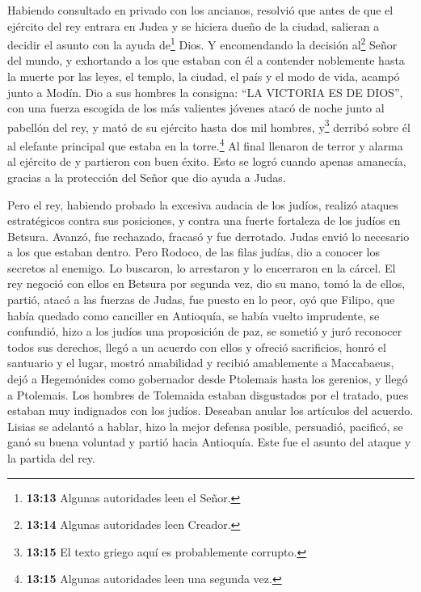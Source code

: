  Habiendo consultado en privado con los ancianos,
resolvió que antes de que el ejército del rey entrara en Judea y se
hiciera dueño de la ciudad, salieran a decidir el asunto con la ayuda
de\footnote{\textbf{13:13} Algunas autoridades leen el Señor.} Dios.
 Y encomendando la decisión al\footnote{\textbf{13:14}
  Algunas autoridades leen Creador.} Señor del mundo, y exhortando a los
que estaban con él a contender noblemente hasta la muerte por las leyes,
el templo, la ciudad, el país y el modo de vida, acampó junto a Modín.
 Dio a sus hombres la consigna: ``LA VICTORIA ES DE
DIOS'', con una fuerza escogida de los más valientes jóvenes atacó de
noche junto al pabellón del rey, y mató de su ejército hasta dos mil
hombres, y\footnote{\textbf{13:15} El texto griego aquí es probablemente
  corrupto.} derribó sobre él al elefante principal que estaba en la
torre.\footnote{\textbf{13:15} Algunas autoridades leen una segunda vez.}
 Al final llenaron de terror y alarma al ejército de y
partieron con buen éxito.  Esto se logró cuando apenas
amanecía, gracias a la protección del Señor que dio ayuda a Judas.

 Pero el rey, habiendo probado la excesiva audacia de los
judíos, realizó ataques estratégicos contra sus posiciones,
 y contra una fuerte fortaleza de los judíos en Betsura.
Avanzó, fue rechazado, fracasó y fue derrotado.  Judas
envió lo necesario a los que estaban dentro.  Pero
Rodoco, de las filas judías, dio a conocer los secretos al enemigo. Lo
buscaron, lo arrestaron y lo encerraron en la cárcel.  El
rey negoció con ellos en Betsura por segunda vez, dio su mano, tomó la
de ellos, partió, atacó a las fuerzas de Judas, fue puesto en lo peor,
 oyó que Filipo, que había quedado como canciller en
Antioquía, se había vuelto imprudente, se confundió, hizo a los judíos
una proposición de paz, se sometió y juró reconocer todos sus derechos,
llegó a un acuerdo con ellos y ofreció sacrificios, honró el santuario y
el lugar,  mostró amabilidad y recibió amablemente a
Maccabaeus, dejó a Hegemónides como gobernador desde Ptolemais hasta los
gerenios,  y llegó a Ptolemais. Los hombres de Tolemaida
estaban disgustados por el tratado, pues estaban muy indignados con los
judíos. Deseaban anular los artículos del acuerdo. 
Lisias se adelantó a hablar, hizo la mejor defensa posible, persuadió,
pacificó, se ganó su buena voluntad y partió hacia Antioquía. Este fue
el asunto del ataque y la partida del rey.

